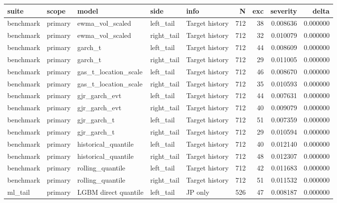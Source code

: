 \begin{tabular}{lllllrrrr}
\toprule
suite & scope & model & side & info & N & exc & severity & delta \\
\midrule
benchmark & primary & ewma\_vol\_scaled & left\_tail & Target history & 712 & 38 & 0.008636 & 0.000000 \\
benchmark & primary & ewma\_vol\_scaled & right\_tail & Target history & 712 & 32 & 0.010079 & 0.000000 \\
benchmark & primary & garch\_t & left\_tail & Target history & 712 & 44 & 0.008609 & 0.000000 \\
benchmark & primary & garch\_t & right\_tail & Target history & 712 & 29 & 0.011005 & 0.000000 \\
benchmark & primary & gas\_t\_location\_scale & left\_tail & Target history & 712 & 46 & 0.008670 & 0.000000 \\
benchmark & primary & gas\_t\_location\_scale & right\_tail & Target history & 712 & 35 & 0.010593 & 0.000000 \\
benchmark & primary & gjr\_garch\_evt & left\_tail & Target history & 712 & 44 & 0.007631 & 0.000000 \\
benchmark & primary & gjr\_garch\_evt & right\_tail & Target history & 712 & 40 & 0.009079 & 0.000000 \\
benchmark & primary & gjr\_garch\_t & left\_tail & Target history & 712 & 51 & 0.007359 & 0.000000 \\
benchmark & primary & gjr\_garch\_t & right\_tail & Target history & 712 & 29 & 0.010594 & 0.000000 \\
benchmark & primary & historical\_quantile & left\_tail & Target history & 712 & 40 & 0.012140 & 0.000000 \\
benchmark & primary & historical\_quantile & right\_tail & Target history & 712 & 48 & 0.012307 & 0.000000 \\
benchmark & primary & rolling\_quantile & left\_tail & Target history & 712 & 42 & 0.011683 & 0.000000 \\
benchmark & primary & rolling\_quantile & right\_tail & Target history & 712 & 51 & 0.011532 & 0.000000 \\
ml\_tail & primary & LGBM direct quantile & left\_tail & JP only & 526 & 47 & 0.008187 & 0.000000 \\

\end{tabular}
